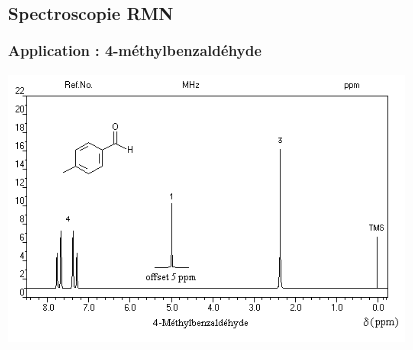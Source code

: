 \documentclass{beamer}
\begin{document}
\begin{frame}
\frametitle{Spectroscopie RMN}
\textbf{Application : 4-méthylbenzaldéhyde}\\
\vspace{0.25cm}
\centerline{\includegraphics[width=10.5cm]{RMN3}}
\end{frame}
\end{document}

